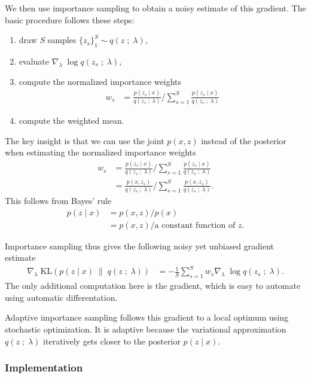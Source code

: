 We then use importance sampling to obtain a noisy estimate of this gradient.
The basic procedure follows these steps:
\begin{enumerate}
  \item draw $S$ samples $\{z_s\}_1^S \sim q(z\;;\;\lambda)$,
  \item evaluate $\nabla_\lambda\; \log q(z_s\;;\;\lambda)$,
  \item compute the normalized importance weights
  \begin{align*}
    w_s
    &=
    \frac{p(z_s \mid x)}{q(z_s\;;\;\lambda)} 
    \Bigg/ 
    \sum_{s=1}^{S}
    \frac{p(z_s \mid x)}{q(z_s\;;\;\lambda)} 
  \end{align*}
  \item compute the weighted mean.
\end{enumerate}
The key insight is that we can use the joint $p(x,z)$ instead of the posterior
when estimating the normalized importance weights
\begin{align*}
  w_s
  &=
  \frac{p(z_s \mid x)}{q(z_s\;;\;\lambda)} 
  \Bigg/ 
  \sum_{s=1}^{S}
  \frac{p(z_s \mid x)}{q(z_s\;;\;\lambda)} \\
  &=
  \frac{p(x, z_s)}{q(z_s\;;\;\lambda)} 
  \Bigg/ 
  \sum_{s=1}^{S}
  \frac{p(x, z_s)}{q(z_s\;;\;\lambda)}.
\end{align*}
This follows from Bayes' rule
\begin{align*}
  p(z \mid x)
  &=
  p(x, z) / p(x)\\
  &=
  p(x, z) / \text{a constant function of }z.
\end{align*}

Importance sampling thus gives the following noisy yet unbiased gradient
estimate
\begin{align*}
\nabla_\lambda\;
  \text{KL}( 
  p(z \mid x)
  \;\|\;
  q(z\;;\;\lambda)
  )
  &=
  -
  \frac{1}{S}
  \sum_{s=1}^S
  w_s
  \nabla_\lambda\; \log q(z_s\;;\;\lambda).
\end{align*}
The only additional computation here is the gradient, which is easy to automate
using automatic differentation.

Adaptive importance sampling follows this gradient to a local optimum using
stochastic optimization. It is adaptive because the variational approximation
$q(z\;;\;\lambda)$ iteratively gets closer to the posterior $p(z \mid x)$.

\subsubsection{Implementation}

